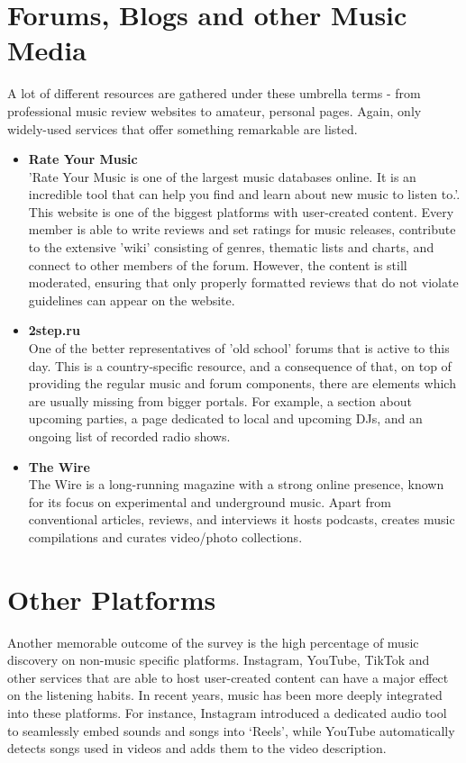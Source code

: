 \section{Forums, Blogs and other Music Media}
A lot of different resources are gathered under these umbrella terms - from professional music review websites to
amateur, personal pages. Again, only widely-used services that offer something remarkable are listed.

\begin{itemize}
    \item \textbf{Rate Your Music} \\
    'Rate Your Music is one of the largest music databases online. It is an incredible tool that
    can help you find and learn about new music to listen to.'\cite{ryt}.\\
    This website is one of the biggest platforms with user-created content.
    Every member is able to write reviews and set ratings for music releases,
    contribute to the extensive 'wiki' consisting of genres, thematic lists and charts,
    and connect to other members of the forum. However, the content is still moderated,
    ensuring that only properly formatted reviews that do not violate guidelines can appear on the website.

    \item \textbf{2step.ru} \\
    One of the better representatives of 'old school' forums that is active to this day.
    This is a country-specific resource, and a consequence of that,
    on top of providing the regular music and forum components, there are elements which are usually missing
    from bigger portals. For example, a section about upcoming parties,
    a page dedicated to local and upcoming DJs, and an ongoing list of recorded radio shows.\cite{2step}

    \item \textbf{The Wire} \\
    The Wire is a long-running magazine with a strong online presence,
    known for its focus on experimental and underground music.
    Apart from conventional articles, reviews, and interviews it hosts podcasts, creates music compilations and curates
    video/photo collections.\cite{thewire}
\end{itemize}


\section{Other Platforms}
Another memorable outcome of the survey is the high percentage of music discovery on non-music specific platforms.
Instagram, YouTube, TikTok and other services that are able to host user-created content can have a major effect on
the listening habits. In recent years, music has been more deeply integrated into these platforms.
For instance, Instagram introduced a dedicated audio tool to seamlessly embed sounds and songs into ‘Reels’\cite{inst_audio},
while YouTube automatically detects songs used in videos and adds them to the video description.



